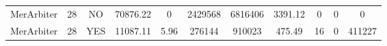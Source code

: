 \begin{table*}[]
\begin{tabular}{@{}ccccccccccc@{}}
        MerArbiter                                               & 28                                                        & NO                                                                 & 70876.22                                                        & 0                                                                        & 2429568                                                    & 6816406                                                       & 3391.12                                                       & 0                                                           & 0                                                                    & 0                                                                    \\
        MerArbiter                                               & 28                                                        & YES                                                                & 11087.11                                                        & 5.96                                                                     & 276144                                                     & 910023                                                        & 475.49                                                        & 16                                                          & 0                                                                    & 411227                                                               \\ \bottomrule
    \end{tabular}
\end{table*}